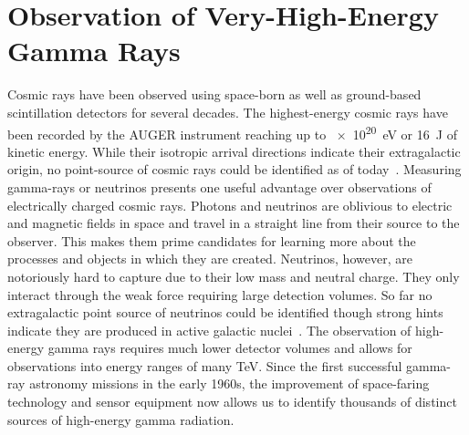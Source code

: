 
\chapter{Observation of Very-High-Energy Gamma Rays}
\label{ch:observatories}
Cosmic rays have been observed using space-born as well as ground-based scintillation detectors for several decades. The
highest-energy cosmic rays have been recorded by the AUGER instrument reaching up to \SI{e20}{\eV} or \SI{16}{\joule} of
kinetic energy. While their isotropic arrival directions indicate their extragalactic origin, no point-source of cosmic rays
could be identified as of today~\cite{auger_isotropic}.
Measuring gamma-rays or neutrinos presents one useful advantage over observations of electrically charged cosmic rays.
Photons and neutrinos are oblivious to electric and magnetic fields in space and travel in a straight line from their source
to the observer. This makes them prime candidates for learning more about the processes and objects in which
they are created. Neutrinos, however, are notoriously hard to capture due to their low mass and neutral charge. They only interact through the weak
force requiring large detection volumes. So far no extragalactic point source of neutrinos could be identified though strong hints indicate
they are produced in active galactic nuclei~\cite{icecube2018multimessenger}.
The observation of high-energy gamma rays  requires much lower detector volumes and allows for observations into energy ranges of many \si{TeV}.
Since the first successful gamma-ray astronomy missions in the early 1960s, the improvement of space-faring technology and sensor equipment
now allows us to identify thousands of distinct sources of high-energy gamma radiation.

